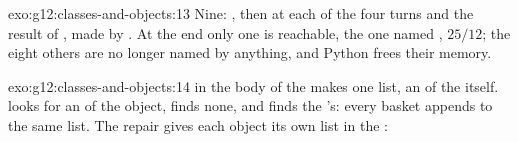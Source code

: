 \begin{solution}{exo:g12:classes-and-objects:13}
Nine: , then at each of the four turns  and the result of \code{+}, made by
. At the end only one is reachable, the one named , $25/12$; the eight others are no longer
named by anything, and Python frees their memory.
\end{solution}

\begin{solution}{exo:g12:classes-and-objects:14}
 in the body of the  makes one list, an  of the  itself.  looks
for an  of the object, finds none, and finds the 's: every basket appends to the same list. The repair
gives each object its own list in the :

\smallskip\noindent\hspace*{2em}

\noindent\hspace*{4em}
\end{solution}

